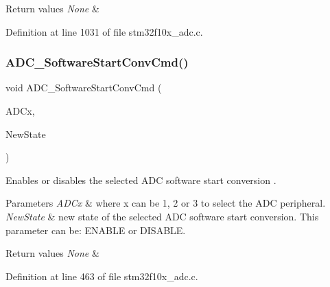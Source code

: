 \begin{DoxyRetVals}{Return values}
{\em None} & \\
\hline
\end{DoxyRetVals}


Definition at line 1031 of file stm32f10x\+\_\+adc.\+c.

\mbox{\label{group___a_d_c___exported___functions_ga694130a8d1ad3c8877b7eddb29611b30}} 
\subsubsection{\texorpdfstring{A\+D\+C\+\_\+\+Software\+Start\+Conv\+Cmd()}{ADC\_SoftwareStartConvCmd()}}
{\footnotesize\ttfamily void A\+D\+C\+\_\+\+Software\+Start\+Conv\+Cmd (\begin{DoxyParamCaption}\item[{\hyperlink{struct_a_d_c___type_def}{A\+D\+C\+\_\+\+Type\+Def} $\ast$}]{A\+D\+Cx,  }\item[{\hyperlink{group___exported__types_gac9a7e9a35d2513ec15c3b537aaa4fba1}{Functional\+State}}]{New\+State }\end{DoxyParamCaption})}



Enables or disables the selected A\+DC software start conversion . 


\begin{DoxyParams}{Parameters}
{\em A\+D\+Cx} & where x can be 1, 2 or 3 to select the A\+DC peripheral. \\
\hline
{\em New\+State} & new state of the selected A\+DC software start conversion. This parameter can be\+: E\+N\+A\+B\+LE or D\+I\+S\+A\+B\+LE. \\
\hline
\end{DoxyParams}

\begin{DoxyRetVals}{Return values}
{\em None} & \\
\hline
\end{DoxyRetVals}


Definition at line 463 of file stm32f10x\+\_\+adc.\+c.

